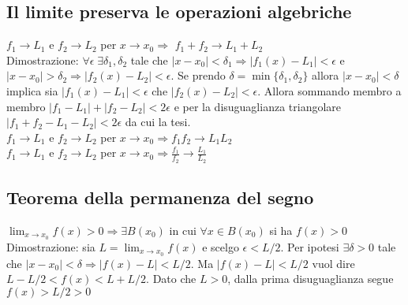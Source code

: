 \documentclass[10pt,a4paper]{article}
\begin{document}
\subsection{Il limite preserva le operazioni algebriche}
$f_1 \longrightarrow L_1$ e $f_2 \longrightarrow L_2$ per $x \longrightarrow x_0 \Longrightarrow$ $f_1+f_2 \longrightarrow L_1+L_2$\\
Dimostrazione: $\forall \epsilon\;\exists \delta_1,\delta_2$ tale che $|x-x_0|<\delta_1 \Rightarrow |f_1(x)-L_1|<\epsilon$ e $|x-x_0|>\delta_2 \Rightarrow |f_2(x)-L_2|<\epsilon$. Se prendo $\delta=\min\{\delta_1,\delta_2\}$ allora $|x-x_0|<\delta$ implica sia $|f_1(x)-L_1|<\epsilon$ che $ |f_2(x)-L_2|<\epsilon$. Allora sommando membro a membro $|f_1-L_1| + |f_2-L_2|<2\epsilon$ e per la disuguaglianza triangolare $|f_1+f_2-L_1-L_2|<2\epsilon$ da cui la tesi.\\

$f_1 \longrightarrow L_1$ e $f_2 \longrightarrow L_2$ per $x \longrightarrow x_0 \Longrightarrow f_1 f_2 \longrightarrow L_1 L_2$\\

$f_1 \longrightarrow L_1$ e $f_2 \longrightarrow L_2$ per $x \longrightarrow x_0 \Longrightarrow \frac{f_1}{f_2} \longrightarrow \frac{L_1} {L_2}$

\subsection{Teorema della permanenza del segno}
 $\lim_{x\to x_0} f(x)>0 \Rightarrow \exists B(x_0)$ in cui $\forall x\in B(x_0)$ si ha $f(x)>0$\\
 Dimostrazione: sia $L=\lim_{x\to x_0} f(x)$ e scelgo $\epsilon<L/2$. Per ipotesi $\exists \delta>0$ tale che $|x-x_0|<\delta \Rightarrow |f(x)-L|<L/2$. Ma $|f(x)-L|<L/2$ vuol dire $L-L/2 < f(x) < L+L/2$. Dato che $L>0$, dalla prima disuguaglianza segue $f(x)>L/2>0$
 
 
\end{document}
